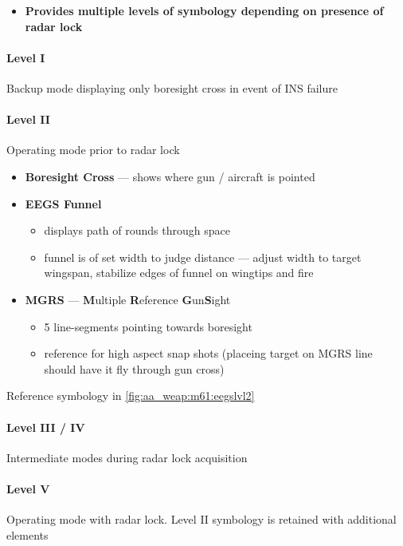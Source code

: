 \begin{itemize}
    \item \textbf{Provides multiple levels of symbology depending on presence of radar lock}
\end{itemize}
\paragraph{Level I} Backup mode displaying only boresight cross in event of INS failure
\paragraph{Level II}
Operating mode prior to radar lock

\begin{itemize}
    \item \textbf{Boresight Cross} --- shows where gun / aircraft is pointed
    \item \textbf{EEGS Funnel}
    \begin{itemize}
        \item displays path of rounds through space
        \item funnel is of set width to judge distance --- adjust width to target wingspan, stabilize edges of funnel on wingtips and fire
    \end{itemize}
    \item \textbf{MGRS} --- \textbf{M}ultiple \textbf{R}eference \textbf{G}un\textbf{S}ight
    \begin{itemize}
        \item 5 line-segments pointing towards boresight
        \item reference for high aspect snap shots (placeing target on MGRS line should have it fly through gun cross)
    \end{itemize}
\end{itemize}

Reference symbology in \cref{fig:aa_weap:m61:eegslvl2}
\paragraph{Level III / IV} Intermediate modes during radar lock acquisition
\paragraph{Level V}
Operating mode with radar lock. Level II symbology is retained with additional elements

